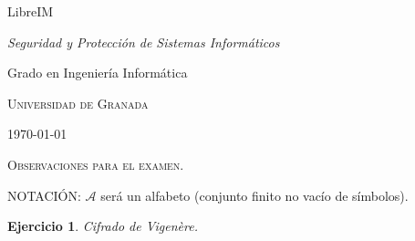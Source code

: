 \documentclass[
  a4paper,
  spanish,
  12pt,
]{scrartcl}
\theoremstyle{ejercicio-style}
\newtheorem{ejer}{Ejercicio}
\theoremstyle{remark-style}
\begin{document}
\begin{flushright}
  LibreIM\vspace{.5em}

  \textit{Seguridad y Protección de Sistemas Informáticos}

  Grado en Ingeniería Informática

  \textsc{Universidad de Granada}\vspace{.5em}

  \today\vspace{.5em}
\end{flushright}

\begin{flushleft}
  \scshape\Large Observaciones para el examen.
\end{flushleft}

NOTACIÓN:
$\mathcal{A}$ será un alfabeto (conjunto finito no vacío de símbolos).

\begin{ejer}
  Cifrado de Vigenère.
\end{ejer}
\end{document}
